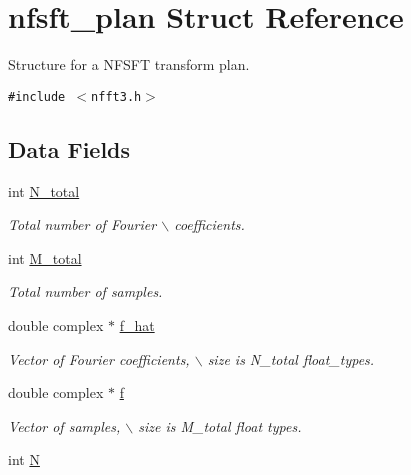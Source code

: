\hypertarget{structnfsft__plan}{
\section{nfsft\_\-plan Struct Reference}
\label{structnfsft__plan}
}
Structure for a NFSFT transform plan.  


{\tt \#include $<$nfft3.h$>$}

\subsection*{Data Fields}
\begin{CompactItemize}
\item 
\hypertarget{structnfsft__plan_o0}{
int \hyperlink{structnfsft__plan_o0}{N\_\-total}}
\label{structnfsft__plan_o0}

\begin{CompactList}\small\item\em Total number of Fourier $\backslash$ coefficients. \item\end{CompactList}\item 
\hypertarget{structnfsft__plan_o1}{
int \hyperlink{structnfsft__plan_o1}{M\_\-total}}
\label{structnfsft__plan_o1}

\begin{CompactList}\small\item\em Total number of samples. \item\end{CompactList}\item 
\hypertarget{structnfsft__plan_o2}{
double complex $\ast$ \hyperlink{structnfsft__plan_o2}{f\_\-hat}}
\label{structnfsft__plan_o2}

\begin{CompactList}\small\item\em Vector of Fourier coefficients, $\backslash$ size is N\_\-total float\_\-types. \item\end{CompactList}\item 
\hypertarget{structnfsft__plan_o3}{
double complex $\ast$ \hyperlink{structnfsft__plan_o3}{f}}
\label{structnfsft__plan_o3}

\begin{CompactList}\small\item\em Vector of samples, $\backslash$ size is M\_\-total float types. \item\end{CompactList}\item 
\hypertarget{structnfsft__plan_o4}{
int \hyperlink{structnfsft__plan_o4}{N}}
\label{structnfsft__plan_o4}


\end{CompactItemize}
